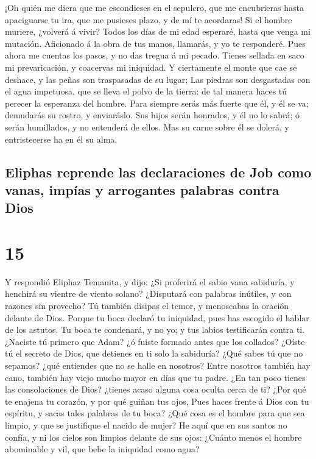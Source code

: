  ¡Oh quién me diera que me escondieses en el sepulcro,
que me encubrieras hasta apaciguarse tu ira, que me pusieses plazo, y de
mí te acordaras!  Si el hombre muriere, ¿volverá á vivir?
Todos los días de mi edad esperaré, hasta que venga mi mutación.
 Aficionado á la obra de tus manos, llamarás, y yo te
responderé.  Pues ahora me cuentas los pasos, y no das
tregua á mi pecado.  Tienes sellada en saco mi
prevaricación, y coacervas mi iniquidad.  Y ciertamente
el monte que cae se deshace, y las peñas son traspasadas de su lugar;
 Las piedras son desgastadas con el agua impetuosa, que
se lleva el polvo de la tierra: de tal manera haces tú perecer la
esperanza del hombre.  Para siempre serás más fuerte que
él, y él se va; demudarás su rostro, y enviaráslo.  Sus
hijos serán honrados, y él no lo sabrá; ó serán humillados, y no
entenderá de ellos.  Mas su carne sobre él se dolerá, y
entristecerse ha en él su alma.

\hypertarget{eliphas-reprende-las-declaraciones-de-job-como-vanas-impuxedas-y-arrogantes-palabras-contra-dios}{%
\subsection{Eliphas reprende las declaraciones de Job como vanas, impías
y arrogantes palabras contra
Dios}\label{eliphas-reprende-las-declaraciones-de-job-como-vanas-impuxedas-y-arrogantes-palabras-contra-dios}}

\hypertarget{section-14}{%
\section{15}\label{section-14}}

 Y respondió Eliphaz Temanita, y dijo:  ¿Si
proferirá el sabio vana sabiduría, y henchirá su vientre de viento
solano?  ¿Disputará con palabras inútiles, y con razones
sin provecho?  Tú también disipas el temor, y menoscabas
la oración delante de Dios.  Porque tu boca declaró tu
iniquidad, pues has escogido el hablar de los astutos.  Tu
boca te condenará, y no yo; y tus labios testificarán contra ti.
 ¿Naciste tú primero que Adam? ¿ó fuiste formado antes que
los collados?  ¿Oíste tú el secreto de Dios, que detienes
en ti solo la sabiduría?  ¿Qué sabes tú que no sepamos?
¿qué entiendes que no se halle en nosotros?  Entre
nosotros también hay cano, también hay viejo mucho mayor en días que tu
padre.  ¿En tan poco tienes las consolaciones de Dios?
¿tienes acaso alguna cosa oculta cerca de ti?  ¿Por qué
te enajena tu corazón, y por qué guiñan tus ojos,  Pues
haces frente á Dios con tu espíritu, y sacas tales palabras de tu boca?
 ¿Qué cosa es el hombre para que sea limpio, y que se
justifique el nacido de mujer?  He aquí que en sus santos
no confía, y ni los cielos son limpios delante de sus ojos:
 ¿Cuánto menos el hombre abominable y vil, que bebe la
iniquidad como agua?

